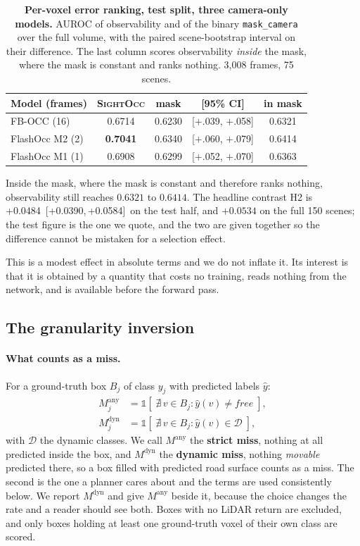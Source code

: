 \documentclass[10pt,twocolumn,letterpaper]{article}
\newcommand{\Hii}{+0.0484}
\newcommand{\HiiCI}{[+0.0390,\,+0.0584]}
\begin{document}
\begin{table}[t]
\centering\small
\begin{tabular}{lcccc}
\toprule
Model (frames) & \textsc{SightOcc} & mask & [95\% CI] & in mask \\
\midrule
FB-OCC (16)      & 0.6714 & 0.6230 & [$+$.039, $+$.058] & 0.6321 \\
FlashOcc M2 (2)  & \textbf{0.7041} & 0.6340 & [$+$.060, $+$.079] & 0.6414 \\
FlashOcc M1 (1)  & 0.6908 & 0.6299 & [$+$.052, $+$.070] & 0.6363 \\
\bottomrule
\end{tabular}
\caption{\textbf{Per-voxel error ranking, test split, three camera-only
models.} AUROC of observability and of the binary \texttt{mask\_camera}
over the full volume, with the paired scene-bootstrap interval on their
difference. The last column scores observability \emph{inside} the mask,
where the mask is constant and ranks nothing. 3{,}008 frames, 75 scenes.}
\label{tab:maskcmp}
\end{table}

Inside the mask, where the mask is constant and therefore ranks nothing,
observability still reaches $0.6321$ to $0.6414$. The headline contrast H2
is \Hii\ \HiiCI\ on the test half, and $+0.0534$ on the full 150 scenes;
the test figure is the one we quote, and the two are given together so the
difference cannot be mistaken for a selection effect.

This is a modest effect in absolute terms and we do not inflate it. Its
interest is that it is obtained by a quantity that costs no training, reads
nothing from the network, and is available before the forward pass.

\subsection{The granularity inversion}
\label{sec:inversion}

\paragraph{What counts as a miss.} For a ground-truth box $B_j$ of class
$y_j$ with predicted labels $\hat{y}$:
\begin{align}
M_j^{\text{any}} &= \mathbb{1}\!\left[\;\nexists\, v \in B_j :
   \hat{y}(v) \neq \textit{free}\;\right], \label{eq:missany}\\
M_j^{\text{dyn}} &= \mathbb{1}\!\left[\;\nexists\, v \in B_j :
   \hat{y}(v) \in \mathcal{D}\;\right], \label{eq:missdyn}
\end{align}
with $\mathcal{D}$ the dynamic classes. We call $M^{\text{any}}$ the \textbf{strict miss}, nothing at all
predicted inside the box, and $M^{\text{dyn}}$ the \textbf{dynamic miss},
nothing \emph{movable} predicted there, so a box filled with predicted road
surface counts as a miss. The second is the one a planner cares about and
the terms are used consistently below. We report
$M^{\text{dyn}}$ and give $M^{\text{any}}$ beside it, because the choice
changes the rate and a reader should see both. Boxes with no LiDAR return
are excluded, and only boxes holding at least one ground-truth voxel of
their own class are scored.
\end{document}
